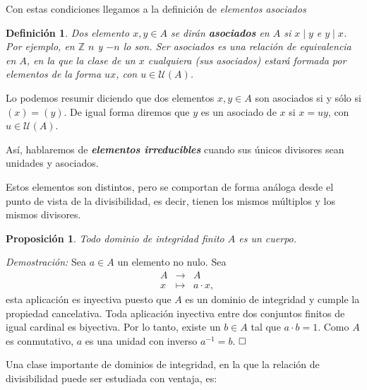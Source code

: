 \documentclass[12pt]{article}
\newtheorem{proposition}[theorem]{Proposición}
\newtheorem{definition}[theorem]{Definición}
\begin{document}
Con estas condiciones llegamos a la definición de \textit{elementos asociados}

\begin{definition}Dos elemento $x,y \in A$ se dirán \textbf{asociados} en $A$ si $x \mid y$ e $y \mid x$. Por ejemplo, en $\mathbb{Z}$ $n$ y $-n$ lo son. Ser asociados es una relación de equivalencia en $A$, en la que la clase de un $x$ cualquiera (sus asociados) estará formada por elementos de la forma $ux$, con $u \in \mathcal{U}(A)$. 
\end{definition}

Lo podemos resumir diciendo que dos elementos $x,y \in A$ son asociados si y sólo si $(x) = (y)$. De igual forma diremos que $y$ es un asociado de $x$ si $x = uy$, con $u \in \mathcal{U}(A)$.

Así, hablaremos de \textbf{\textit{elementos irreducibles}} cuando sus únicos divisores sean unidades y asociados.

Estos elementos son distintos, pero se comportan de forma análoga desde el punto de vista de la divisibilidad, es decir, tienen los mismos múltiplos y los mismos divisores.

\begin{proposition}Todo dominio de integridad finito $A$ es un cuerpo.
\end{proposition}
\emph{Demostración: }Sea $a \in A$ un elemento no nulo. Sea $$\begin{array}{rccl}
&A&\longrightarrow &A \\
&x& \longmapsto &a\cdot x,
\end{array}
$$
esta aplicación es inyectiva puesto que $A$ es un dominio de integridad y cumple la propiedad cancelativa. Toda aplicación inyectiva entre dos conjuntos finitos de igual cardinal es biyectiva. Por lo tanto, existe un $b \in A$ tal que $a \cdot b = 1$. Como $A$ es conmutativo, $a$ es una unidad con inverso $a^{-1}=b$.
$\hfill \square$

Una clase importante de dominios de integridad, en la que la relación de divisibilidad puede ser estudiada con ventaja, es:
\end{document}
